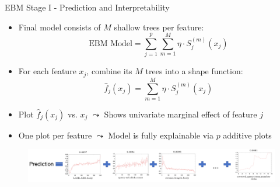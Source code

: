 \documentclass[11pt,compress,t,notes=noshow, aspectratio=169, xcolor=table]{beamer}
\begin{document}




\begin{frame}{EBM Stage I - Prediction and Interpretability}
\begin{itemize}
    \item Final model consists of $M$ shallow trees per feature:
    $$
    \text{EBM Model} = \sum_{j=1}^p \sum_{m=1}^M \eta \cdot S_j^{(m)}(x_j)
    $$
    \item For each feature $x_j$, combine its $M$ trees into a shape function:
    $$
    \hat{f}_j(x_j) = \sum_{m=1}^M \eta \cdot S_j^{(m)}(x_j)
    $$
    \item Plot $\hat{f}_j(x_j)$ vs. $x_j$ $\leadsto$ Shows univariate marginal effect of feature $j$
    \item One plot per feature $\leadsto$ Model is fully explainable via $p$ additive plots
\end{itemize}

\medskip

\begin{figure}
    \centering
    \includegraphics[width=\textwidth]{figure/ebm_prediction.png}
\end{figure}
\end{frame}
\end{document}
